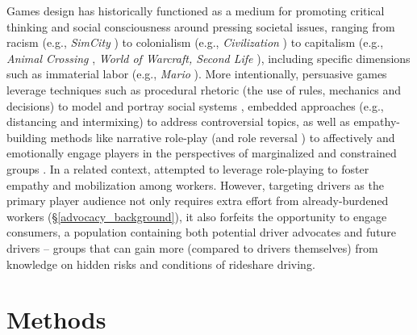 Games design has historically functioned as a medium for promoting critical thinking and social consciousness around pressing societal issues, ranging from racism (e.g., \textit{SimCity} \cite{consciousness}) to colonialism (e.g., \textit{Civilization} \cite{civ}) to capitalism (e.g., \textit{Animal Crossing} \cite{crossing}, \textit{World of Warcraft,  Second Life} \cite{negotiate}), including specific dimensions such as immaterial labor (e.g.,  \textit{Mario} \cite{wow}). More intentionally, persuasive games leverage techniques such as procedural rhetoric (the use of rules, mechanics and decisions) to model and portray social systems \cite{persuasive}, embedded approaches (e.g., distancing and intermixing) to address controversial topics, as well as empathy-building methods like narrative role-play (and role reversal \cite{mr_empathy}) to affectively and emotionally engage players in the perspectives of marginalized and constrained groups
\cite{papers, narration}. 
In a related context, \citet{cards} attempted to leverage role-playing to foster empathy and mobilization among workers. However, targeting drivers as the primary player audience not only requires extra effort from already-burdened workers (\S\ref{advocacy_background}), it also forfeits the opportunity to engage consumers, a population containing both potential driver advocates and future drivers -- groups that can gain more (compared to drivers themselves) from knowledge on hidden risks and conditions of rideshare driving.


\section{Methods} \label{method}
